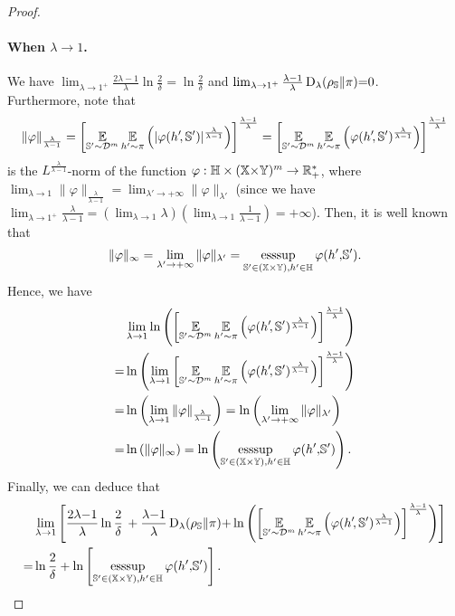 \begin{noaddcontents}
\begin{proof}
\paragraph{When $\lambda\rightarrow 1$.}
We have $\lim_{\lambda\rightarrow 1^+}\frac{2\lambda{-}1}{\lambda}\ln\!\frac{2}{\delta}{=}\ln\frac{2}{\delta}$ and $\lim_{\lambda\rightarrow 1^+}\frac{\lambda-1}{\lambda}\operatorname{D}_{\lambda}(\rho_{\mathbb{S}}\|\pi){=}0$.\\
Furthermore, note that 
\begin{align*}
    \|\varphi\|_{\frac{\lambda}{\lambda{-}1}} = \left[\operatorname*{\mathbb{E}}_{\mathbb{S}'{\sim}\mathcal{D}^{m}}\operatorname*{\mathbb{E}}_{h'{\sim}\pi}\left(\vert\varphi(h'\!, \mathbb{S}')\vert^{\frac{\lambda}{\lambda{-}1}}\right)\right]^{\frac{\lambda{-}1}{\lambda}} = \left[\operatorname*{\mathbb{E}}_{\mathbb{S}'{\sim}\mathcal{D}^{m}}\operatorname*{\mathbb{E}}_{h'{\sim}\pi}\left(\varphi(h'\!, \mathbb{S}')^{\frac{\lambda}{\lambda{-}1}}\right)\right]^{\frac{\lambda{-}1}{\lambda}}
\end{align*}
is the $L^{\frac{\lambda}{\lambda{-}1}}$-norm of the function $\varphi: \mathbb{H}\times(\mathbb{X}{\times}\mathbb{Y})^m \rightarrow \mathbb{R}_{+}^*$, where $\lim_{\lambda\rightarrow 1} \|\varphi\|_{\frac{\lambda}{\lambda{-}1}} = \lim_{\lambda'\rightarrow +\infty} \|\varphi\|_{\lambda'}$ (since we have $\lim_{\lambda\rightarrow 1^+}\frac{\lambda}{\lambda{-}1} = (\lim_{\lambda\rightarrow1}\lambda)(\lim_{\lambda\rightarrow1}\frac{1}{\lambda{-}1}) = +\infty$).
Then, it is well known that
\begin{align*}
    \|\varphi\|_{\infty}= \lim_{\lambda'\rightarrow+\infty}\|\varphi\|_{\lambda'} = \operatorname*{\text{\rm esssup}}_{\mathbb{S}'\in(\mathbb{X}{\times}\mathbb{Y}), h'\in\mathbb{H}}\varphi(h'{,} \mathbb{S}').
\end{align*}
Hence, we have 
\begin{align*}
    &\lim_{\lambda\rightarrow1} \ln\left(\left[\operatorname*{\mathbb{E}}_{\mathbb{S}'{\sim}\mathcal{D}^{m}}\operatorname*{\mathbb{E}}_{h'{\sim}\pi}\left(\varphi(h'\!, \mathbb{S}')^{\frac{\lambda}{\lambda{-}1}}\right)\right]^{\frac{\lambda{-}1}{\lambda}}\right)\\
    = &\ln\left( \lim_{\lambda\rightarrow1} \left[\operatorname*{\mathbb{E}}_{\mathbb{S}'{\sim}\mathcal{D}^{m}}\operatorname*{\mathbb{E}}_{h'{\sim}\pi}\left(\varphi(h'\!, \mathbb{S}')^{\frac{\lambda}{\lambda{-}1}}\right)\right]^{\frac{\lambda{-}1}{\lambda}}\right)\\
    = &\ln\left( \lim_{\lambda\rightarrow1} \| \varphi\|_{\frac{\lambda}{\lambda-1}}\right) = \ln\left( \lim_{\lambda'\rightarrow+\infty} \| \varphi\|_{\lambda'}\right) \\
    = &\ln\left( \| \varphi\|_{\infty}\right) = \ln\left( \operatorname*{\text{\rm esssup}}_{\mathbb{S}'\in(\mathbb{X}{\times}\mathbb{Y}), h'\in\mathbb{H}}\varphi(h'{,} \mathbb{S}') \right).
\end{align*}
Finally, we can deduce that 
\begin{align*}
    &\lim_{\lambda\rightarrow 1}\left[{\frac{2\lambda{-}1}{\lambda}}\ln\frac{2}{\delta}\, +\frac{\lambda{-}1}{\lambda}\operatorname{D}_{\lambda}(\rho_{\mathbb{S}}\|\pi){+} \ln\left(\left[\operatorname*{\mathbb{E}}_{\mathbb{S}'{\sim}\mathcal{D}^{m}}\operatorname*{\mathbb{E}}_{h'{\sim}\pi}\left(\varphi(h'\!, \mathbb{S}')^{\frac{\lambda}{\lambda{-}1}}\right)\right]^{\frac{\lambda{-}1}{\lambda}}\right)\right]\\
    = &\ln\frac{2}{\delta} + \ln\left[\operatorname*{\text{\rm esssup}}_{\mathbb{S}'\in(\mathbb{X}{\times}\mathbb{Y}), h'\in\mathbb{H}}\varphi(h'{,} \mathbb{S}')\right].
\end{align*}


\end{proof}
\end{noaddcontents}
